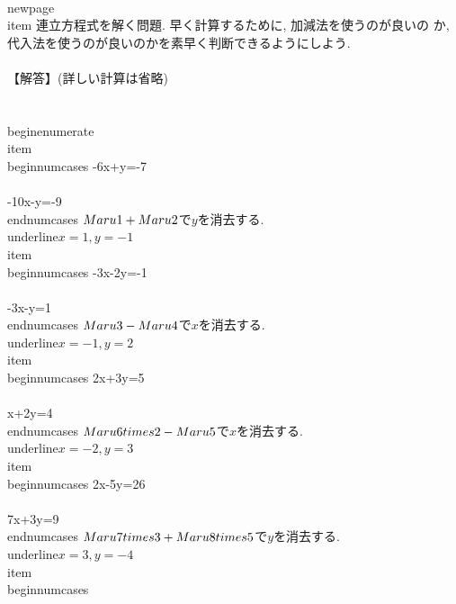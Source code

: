  \\newpage
 \\item 連立方程式を解く問題. 早く計算するために, 加減法を使うのが良いの
       か, 代入法を使うのが良いのかを素早く判断できるようにしよう.\\\\
       【解答】(詳しい計算は省略)\\\\
       \\begin{enumerate}
	\\item \\begin{numcases}{}
		 -6x+y=-7\\\\
		 -10x-y=-9
	      \\end{numcases}
	      $\\Maru{1}+\\Maru{2}$で$y$を消去する. \\underline{$x=1,y=-1$} 
	 \\item 	\\begin{numcases}{}
		 -3x-2y=-1\\\\
		 -3x-y=1
		\\end{numcases}
		$\\Maru{3}-\\Maru{4}$で$x$を消去する.
		\\underline{$x=-1,y=2$} 
	\\item 	\\begin{numcases}{}
		 2x+3y=5\\\\
		 x+2y=4
		\\end{numcases}
		$\\Maru{6}\\times2-\\Maru{5}$で$x$を消去する.
		\\underline{$x=-2,y=3$} 
	\\item 	\\begin{numcases}{}
		 2x-5y=26\\\\
		 7x+3y=9
		\\end{numcases}
		$\\Maru{7}\\times3+\\Maru{8}\\times5$で$y$を消去する.
		\\underline{$x=3,y=-4$} 
	 \\item 	\\begin{numcases}{}
